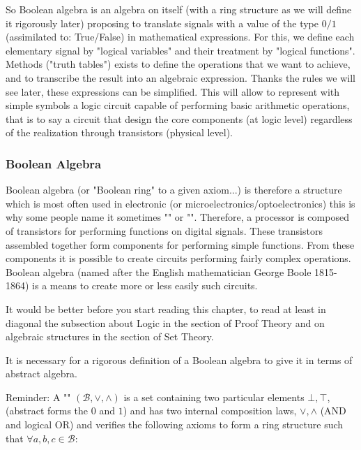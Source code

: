 		So Boolean algebra is an algebra on itself (with a ring structure as we will define it rigorously later) proposing to translate signals with a value of the type $0/1$ (assimilated to: True/False) in mathematical expressions. For this, we define each elementary signal by "logical variables" and their treatment by "logical functions". Methods ("truth tables") exists to define the operations that we want to achieve, and to transcribe the result into an algebraic expression. Thanks the rules we will see later, these expressions can be simplified. This will allow to represent with simple symbols a logic circuit capable of performing basic arithmetic operations, that is to say a circuit that design the core components (at logic level) regardless of the realization through transistors (physical level).
	
	\subsubsection{Boolean Algebra}\label{boolean algebra}
	Boolean algebra (or "Boolean ring" to a given axiom...) is therefore a structure which is most often used in electronic (or microelectronics/optoelectronics) this is why some people name it sometimes "" or "". Therefore, a processor is composed of transistors for performing functions on digital signals. These transistors assembled together form components for performing simple functions. From these components it is possible to create circuits performing fairly complex operations. Boolean algebra (named after the English mathematician George Boole 1815-1864) is a means to create more or less easily such circuits.
	
	\begin{tcolorbox}[title=Remark,colframe=black,arc=10pt]
	It would be better before you start reading this chapter, to read at least in diagonal the subsection about Logic in the section of Proof Theory and on algebraic structures in the section of Set Theory.
	\end{tcolorbox}
	It is necessary for a rigorous definition of a Boolean algebra to give it in terms of abstract algebra.
	
	Reminder: A "" $(\mathcal{B},\vee,\wedge)$ is a set containing two particular elements $\bot,\top$, (abstract forms the $0$ and $1$) and has two internal composition laws, $\vee,\wedge$ (AND and logical OR) and verifies the following axioms to form a ring structure such that $\forall a,b,c\in \mathcal{B}$:
	
